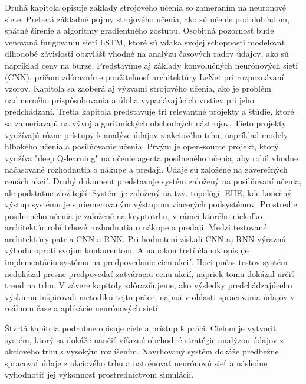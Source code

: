 \documentclass[a4paper,oneside,onecolumn,12pt]{book}
\begin{document}
Druhá kapitola opisuje základy strojového učenia so zameraním na neurónové siete. Preberá základné pojmy strojového učenia, ako sú učenie pod dohľadom, spätné šírenie a algoritmy gradientného zostupu. Osobitná pozornosť bude venovaná fungovaniu sietí LSTM, ktoré sú vďaka svojej schopnosti modelovať dlhodobé závislosti obzvlášť vhodné na analýzu časových radov údajov, ako sú napríklad ceny na burze. Predstavíme aj základy konvolučných neurónových sietí (CNN), pričom zdôrazníme použiteľnosť architektúry LeNet pri rozpoznávaní vzorov. Kapitola sa zaoberá aj výzvami strojového učenia, ako je problém nadmerného prispôsobovania a úloha vypadávajúcich vrstiev pri jeho predchádzaní.
Tretia kapitola predstavuje tri relevantné projekty a štúdie, ktoré sa zameriavajú na vývoj algoritmických obchodných nástrojov. Tieto projekty využívajú rôzne prístupy k analýze údajov z akciového trhu, napríklad modely hlbokého učenia a posilňovanie učenia. Prvým je open-source projekt, ktorý využíva "deep Q-learning" na učenie agenta posilneného učenia, aby robil vhodne načasované rozhodnutia o nákupe a predaji. Údaje sú založené na záverečných cenách akcií. Druhý dokument predstavuje systém založený na posilňovaní učenia, ale podstatne zložitejší.  Systém je založený na tzv. topológii EIIE, kde konečný výstup systému je spriemerovaným výstupom viacerých podsystémov. Prostredie posilneného učenia je založené na kryptotrhu, v rámci ktorého niekoľko architektúr robí trhové rozhodnutia o nákupe a predaji. Medzi testované architektúry patria CNN a RNN. Pri hodnotení získali CNN aj RNN výraznú výhodu oproti svojim konkurentom. A napokon tretí článok opisuje implementáciu systému na predpovedanie cien akcií. Hoci počas testov systém nedokázal presne predpovedať zatváraciu cenu akcií, napriek tomu dokázal určiť trend na trhu. V závere kapitoly zdôrazňujeme, ako výsledky predchádzajúceho výskumu inšpirovali metodiku tejto práce, najmä v oblasti spracovania údajov v reálnom čase a aplikácie neurónových sietí.

Štvrtá kapitola podrobne opisuje ciele a prístup k práci. Cieľom je vytvoriť systém, ktorý sa dokáže naučiť víťazné obchodné stratégie analýzou údajov z akciového trhu s vysokým rozlíšením. Navrhovaný systém dokáže predbežne spracovať údaje z akciového trhu a natrénovať neurónovú sieť a následne vyhodnotiť jej výkonnosť prostredníctvom simulácií.
\end{document}
